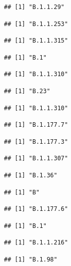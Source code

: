 \documentclass[
]{article}
\begin{document}
\begin{verbatim}
## [1] "B.1.1.29"
\end{verbatim}

\begin{verbatim}
## [1] "B.1.1.253"
\end{verbatim}

\begin{verbatim}
## [1] "B.1.1.315"
\end{verbatim}

\begin{verbatim}
## [1] "B.1"
\end{verbatim}

\begin{verbatim}
## [1] "B.1.1.310"
\end{verbatim}

\begin{verbatim}
## [1] "B.23"
\end{verbatim}

\begin{verbatim}
## [1] "B.1.1.310"
\end{verbatim}

\begin{verbatim}
## [1] "B.1.177.7"
\end{verbatim}

\begin{verbatim}
## [1] "B.1.177.3"
\end{verbatim}

\begin{verbatim}
## [1] "B.1.1.307"
\end{verbatim}

\begin{verbatim}
## [1] "B.1.36"
\end{verbatim}

\begin{verbatim}
## [1] "B"
\end{verbatim}

\begin{verbatim}
## [1] "B.1.177.6"
\end{verbatim}

\begin{verbatim}
## [1] "B.1"
\end{verbatim}

\begin{verbatim}
## [1] "B.1.1.216"
\end{verbatim}

\begin{verbatim}
## [1] "B.1.98"
\end{verbatim}
\end{document}
